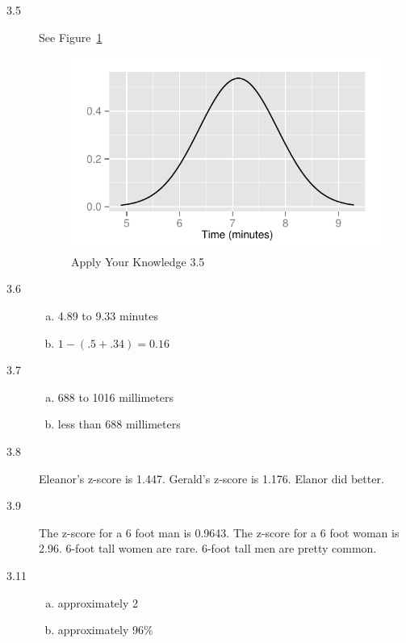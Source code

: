 \documentclass[landscape]{exam}
\begin{document}
  \begin{description}
    \item[3.5]
      See Figure~\ref{fig:ayn_3.5}

      \begin{figure}[H]
        \centering
        \includegraphics[scale = 0.9]{figures/ayn_3_5.pdf}
        \caption{Apply Your Knowledge 3.5}\label{fig:ayn_3.5}
      \end{figure}

    \item[3.6]
      \begin{enumerate}[(a)]
        \item 4.89 to 9.33 minutes

        \item $1 - (.5 + .34) = 0.16$
      \end{enumerate}

    \item[3.7]
      \begin{enumerate}[(a)]
        \item 688 to 1016 millimeters

        \item less than 688 millimeters
      \end{enumerate}

    \item[3.8] Eleanor's z-score is 1.447. Gerald's z-score is 1.176. Elanor did
      better.

    \item[3.9] The z-score for a 6 foot man is 0.9643. The z-score for a 6 foot
      woman is 2.96. 6-foot tall women are rare. 6-foot tall men are pretty
      common.

    \item[3.11]
      \begin{enumerate}[(a)]
        \item approximately 2%
        \item approximately 96\%
      \end{enumerate}


\end{description}
\end{document}
